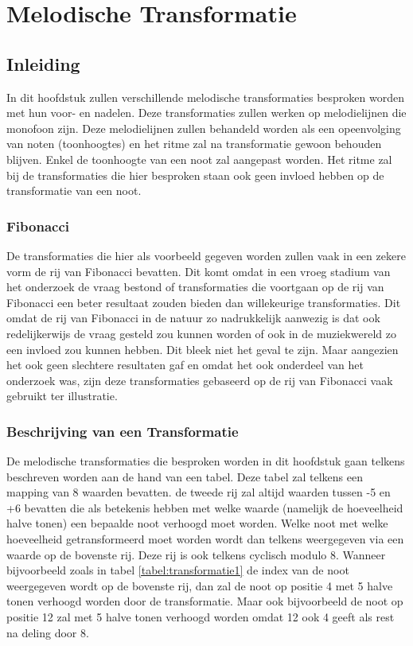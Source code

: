 \chapter{Melodische Transformatie}
\label{hoofdstuk:MT}

\section{Inleiding}
In dit hoofdstuk zullen verschillende melodische transformaties besproken worden met hun voor- en nadelen. Deze transformaties zullen werken op melodielijnen die monofoon zijn. Deze melodielijnen zullen behandeld worden als een opeenvolging van noten (toonhoogtes) en het ritme zal na transformatie gewoon behouden blijven. Enkel de toonhoogte van een noot zal aangepast worden. Het ritme zal bij de transformaties die hier besproken staan ook geen invloed hebben op de transformatie van een noot. 

\subsection{Fibonacci}
De transformaties die hier als voorbeeld gegeven worden zullen vaak in een zekere vorm de rij van Fibonacci\cite{url:Fibonacci} bevatten. Dit komt omdat in een vroeg stadium van het onderzoek de vraag bestond of transformaties die voortgaan op de rij van Fibonacci een beter resultaat zouden bieden dan willekeurige transformaties. Dit omdat de rij van Fibonacci in de natuur zo nadrukkelijk aanwezig is dat ook redelijkerwijs de vraag gesteld zou kunnen worden of ook in de muziekwereld zo een invloed zou kunnen hebben. Dit bleek niet het geval te zijn. Maar aangezien het ook geen slechtere resultaten gaf en omdat het ook onderdeel van het onderzoek was, zijn deze transformaties gebaseerd op de rij van Fibonacci vaak gebruikt ter illustratie.

\subsection{Beschrijving van een Transformatie}
De melodische transformaties die besproken worden in dit hoofdstuk gaan telkens beschreven worden aan de hand van een tabel. Deze tabel zal telkens een mapping van 8 waarden bevatten. de tweede rij zal altijd waarden tussen -5 en +6 bevatten die als betekenis hebben met welke waarde (namelijk de hoeveelheid halve tonen) een bepaalde noot verhoogd moet worden. Welke noot met welke hoeveelheid getransformeerd moet worden wordt dan telkens weergegeven via een waarde op de bovenste rij. Deze rij is ook telkens cyclisch modulo 8. Wanneer bijvoorbeeld zoals in tabel \ref{tabel:transformatie1} de index van de noot weergegeven wordt op de bovenste rij, dan zal de noot op positie 4 met 5 halve tonen verhoogd worden door de transformatie. Maar ook bijvoorbeeld de noot op positie 12 zal met 5 halve tonen verhoogd worden omdat 12 ook 4 geeft als rest na deling door 8.

